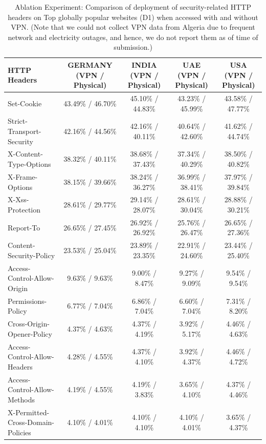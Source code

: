 \begin{table}[!ht]
    \centering
    \footnotesize
    \caption{Ablation Experiment: Comparison of deployment of security-related HTTP headers on Top  globally popular websites (D1) when accessed with and without VPN. (Note that we could not collect VPN data from Algeria due to frequent network and electricity outages, and hence, we do not report them as of time of submission.)}
    \label{tab:vpn_headers}
    \begin{tabular}{l|c|c|c|c}
    \toprule
        HTTP Headers & GERMANY (VPN / Physical) & INDIA (VPN / Physical) & UAE (VPN / Physical) & USA (VPN / Physical) \\ \midrule
        Set-Cookie & 43.49\% / 46.70\% & 45.10\% / 44.83\% & 43.23\% / 45.99\% & 43.58\% / 47.77\% \\ \hline
        Strict-Transport-Security & 42.16\% / 44.56\% & 42.16\% / 40.11\% & 40.64\% / 42.60\% & 41.62\% / 44.74\% \\ \hline
        X-Content-Type-Options & 38.32\% / 40.11\% & 38.68\% / 37.43\% & 37.34\% / 40.29\% & 38.50\% / 40.82\% \\ \hline
        X-Frame-Options & 38.15\% / 39.66\% & 38.24\% / 36.27\% & 36.99\% / 38.41\% & 37.97\% / 39.84\% \\ \hline
        X-Xss-Protection & 28.61\% / 29.77\% & 29.14\% / 28.07\% & 28.61\% / 30.04\% & 28.88\% / 30.21\% \\ \hline
        Report-To & 26.65\% / 27.45\% & 26.92\% / 26.92\% & 25.76\% / 26.47\% & 26.65\% / 27.36\% \\ \hline
        Content-Security-Policy & 23.53\% / 25.04\% & 23.89\% / 23.35\% & 22.91\% / 24.60\% & 23.44\% / 25.40\% \\ \hline
        Access-Control-Allow-Origin & 9.63\% / 9.63\% & 9.00\% / 8.47\% & 9.27\% / 9.09\% & 9.54\% / 9.54\% \\ \hline
        Permissions-Policy & 6.77\% / 7.04\% & 6.86\% / 7.04\% & 6.60\% / 7.04\% & 7.31\% / 8.20\% \\ \hline
        Cross-Origin-Opener-Policy & 4.37\% / 4.63\% & 4.37\% / 4.19\% & 3.92\% / 5.17\% & 4.46\% / 4.63\% \\ \hline
        Access-Control-Allow-Headers & 4.28\% / 4.55\% & 4.37\% / 4.10\% & 3.92\% / 4.37\% & 4.46\% / 4.72\% \\ \hline
        Access-Control-Allow-Methods & 4.19\% / 4.55\% & 4.19\% / 3.83\% & 3.65\% / 4.10\% & 4.37\% / 4.46\% \\ \hline
        X-Permitted-Cross-Domain-Policies & 4.10\% / 4.01\% & 4.10\% / 4.10\% & 4.10\% / 4.01\% & 3.65\% / 4.37\% \\ \hline

\end{tabular}
\end{table}
